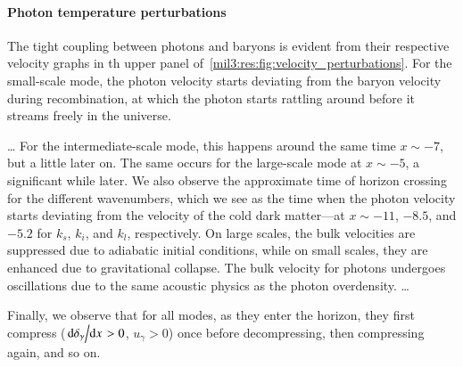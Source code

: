 

\paragraph{Photon temperature perturbations}
The tight coupling between photons and baryons is evident from their respective velocity graphs in th upper panel of~\cref{mil3:res:fig:velocity_perturbations}. For the small-scale mode, the photon velocity starts deviating from the baryon velocity during recombination, at which the photon starts rattling around before it streams freely in the universe.

\dots
For the intermediate-scale mode, this happens around the same time $x\sim-7$, but a little later on. The same occurs for the large-scale mode at $x\sim -5$, a significant while later. We also observe the approximate time of horizon crossing for the different wavenumbers, which we see as the time when the photon velocity starts deviating from the velocity of the cold dark matter---at $x\sim -11$, $-8.5$, and $-5.2$ for $k_s$, $k_i$, and $k_l$, respectively. On large scales, the bulk velocities are suppressed due to adiabatic initial conditions, while on small scales, they are enhanced due to gravitational collapse. The bulk velocity for photons undergoes oscillations due to the same acoustic physics as the photon overdensity.
\dots

Finally, we observe that for all modes, as they enter the horizon, they first compress ($\dv*{\delta_\gamma}{x}> 0$, $u_\gamma> 0$) once before decompressing, then compressing again, and so on. 

